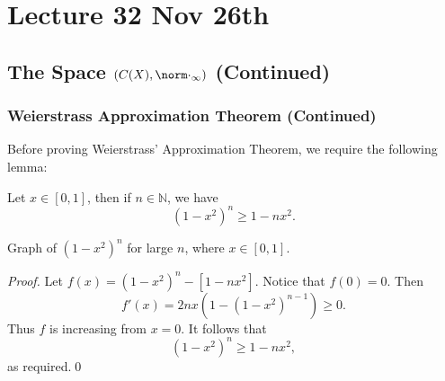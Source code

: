 \documentclass[notoc,notitlepage]{tufte-book}
\begin{document}



\chapter{Lecture 32 Nov 26th}%
\label{chp:lecture_32_nov_26th}

\section{The Space $(C(X), \norm\cdot_\infty)$ (Continued)}%
\label{sec:the_space_c_x_normcdot_infty_continued}

\subsection{Weierstrass Approximation Theorem (Continued)}%
\label{sub:weierstrass_approximation_theorem_continued}

Before proving Weierstrass' Approximation Theorem, we require the following lemma:

\begin{lemma}\label{lemma:lemma_for_weierstrass_approximation}
  Let $x \in [0, 1]$, then if $n \in \mathbb{N}$, we have
  \begin{equation*}
    (1 - x^2)^n \geq 1 - nx^2.
  \end{equation*}
  \begin{marginfigure}
    \centering
    \caption{Graph of $(1 - x^2)^n$ for large $n$, where $x \in [0, 1]$.}\label{fig:graph_of_1_x_2_n_for_large_n_where_x_in_0_1_}
  \end{marginfigure}
\end{lemma}

\begin{proof}
  Let $f(x) = (1 - x^2)^n - [ 1 - nx^2 ]$. Notice that $f(0) = 0$. Then
  \begin{equation*}
    f'(x) = 2nx\left( 1 - \left( 1 - x^2 \right)^{n - 1} \right) \geq 0.
  \end{equation*}
  Thus $f$ is increasing from $x = 0$. It follows that
  \begin{equation*}
    (1 - x^2)^n \geq 1 - nx^2,
  \end{equation*}
  as required.\qed\
\end{proof}
\end{document}
